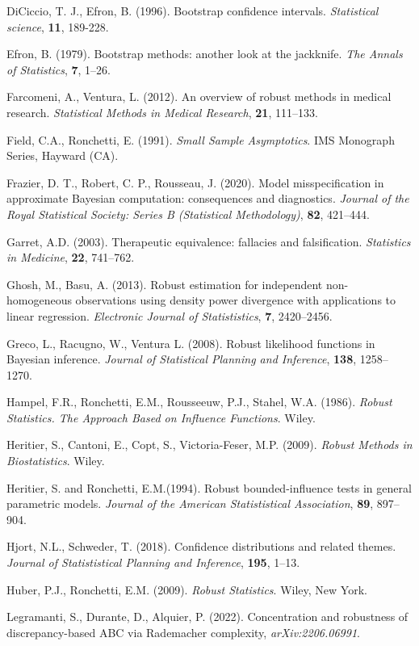 \documentclass[preprint,12pt,authoryear]{elsarticle}
\begin{document}
\begin{description}
DiCiccio, T. J., Efron, B. (1996). Bootstrap confidence intervals. {\em Statistical science}, {\bf 11}, 189-228.
\item
Efron, B. (1979). Bootstrap methods: another look at the jackknife. { \em The Annals of Statistics}, {\bf 7}, 1--26.
\item
Farcomeni, A., Ventura, L. (2012). An overview of robust methods in medical research. {\em Statistical Methods in Medical Research}, {\bf 21}, 111--133.
\item
Field, C.A., Ronchetti, E. (1991). {\em Small Sample Asymptotics}. IMS Monograph Series, Hayward (CA).
\item
Frazier, D. T., Robert, C. P.,  Rousseau, J. (2020). Model misspecification in approximate Bayesian computation: consequences and diagnostics.{ \em Journal of the Royal Statistical Society: Series B (Statistical Methodology)}, {\bf 82}, 421--444.
\item
Garret, A.D. (2003). Therapeutic equivalence: fallacies and falsification. {\em Statistics in Medicine},  {\bf 22}, 741--762.
\item
Ghosh, M., Basu, A. (2013). Robust estimation for independent non-homogeneous observations using density power divergence with applications to linear regression. {\em Electronic Journal of Statististics}, {\bf 7}, 2420--2456.
\item
Greco, L., Racugno, W., Ventura L. (2008). Robust likelihood functions in Bayesian inference. {\em Journal of Statistical Planning and Inference}, {\bf 138}, 1258--1270.
\item
Hampel, F.R., Ronchetti, E.M., Rousseeuw, P.J., Stahel, W.A. (1986). {\em Robust Statistics. The Approach Based on Influence Functions}. Wiley.
\item
Heritier, S., Cantoni, E., Copt, S., Victoria-Feser, M.P. (2009). {\em Robust Methods in Biostatistics}. Wiley.
\item
Heritier, S. and Ronchetti, E.M.(1994). Robust bounded-influence tests in general parametric models.  {\em Journal of the American Statististical Association}, {\bf 89}, 897--904.
\item
Hjort, N.L., Schweder, T. (2018). Confidence distributions and related themes. {\em Journal of Statististical Planning and Inference}, {\bf 195}, 1--13.
\item
Huber, P.J., Ronchetti, E.M. (2009). {\em Robust Statistics}. Wiley, New York.
\item 
Legramanti, S., Durante, D., Alquier, P. (2022). Concentration and robustness of discrepancy-based ABC via Rademacher complexity, {\em arXiv:2206.06991}.

\end{description}
\end{document}
